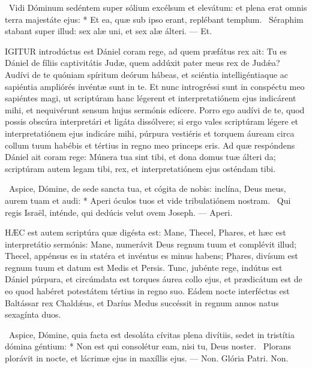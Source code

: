 \R\ Vidi Dóminum sedéntem super sólium excélsum et elevátum: et plena erat omnis terra majestáte ejus: * Et ea, quæ sub ipso erant, replébant templum. \V\ Séraphim stabant super illud: sex alæ uni, et sex alæ álteri. — Et.


\lettrine[lines=2]{I}{GITUR} introdúctus est Dániel coram rege, ad quem præfátus rex ait: Tu es Dániel de fíliis captivitátis Judæ, quem addúxit pater meus rex de Judǽa? Audívi de te quóniam spíritum deórum hábeas, et sciéntia intelligéntiaque ac sapiéntia ampliórés invéntæ sunt in te. Et nunc introgréssi sunt in conspéctu meo sapiéntes magi, ut scriptúram hanc légerent et interpretatiónem ejus indicárent mihi, et nequivérunt sensum hujus sermónis edícere. Porro ego audívi de te, quod possis obscúra interpretári et ligáta dissólvere; si ergo vales scriptúram légere et interpretatiónem ejus indicáre mihi, púrpura vestiéris et torquem áuream circa collum tuum habébis et tértius in regno meo princeps eris. Ad quæ respóndens Dániel ait coram rege: Múnera tua sint tibi, et dona domus tuæ álteri da; scriptúram autem legam tibi, rex, et interpretatiónem ejus osténdam tibi.

\R\ Aspice, Dómine, de sede sancta tua, et cógita de nobis: inclína, Deus meus, aurem tuam et audi: * Aperi óculos tuos et vide tribulatiónem nostram. \V\ Qui regis Israël, inténde, qui dedúcis velut ovem Joseph. — Aperi.



\lettrine[lines=2]{H}{ÆC} est autem scriptúra quæ digésta est: Mane, Thecel, Phares, et hæc est interpretátio sermónis: Mane, numerávit Deus regnum tuum et complévit illud; Thecel, appénsus es in statéra et invéntus es minus habens; Phares, divísum est regnum tuum et datum est Medis et Persis. Tunc, jubénte rege, indútus est Dániel púrpura, et circúmdata est torques áurea collo ejus, et prædicátum est de eo quod habéret potestátem tértius in regno suo. Eádem nocte interféctus est Baltássar rex Chaldǽus, et Daríus Medus succéssit in regnum annos natus sexagínta duos.

\R\ Aspice, Dómine, quia facta est desoláta cívitas plena divítiis, sedet in tristítia dómina géntium: * Non est qui consolétur eam, nisi tu, Deus noster. \V\ Plorans plorávit in nocte, et lácrimæ ejus in maxíllis ejus. — Non. Glória Patri. Non.

